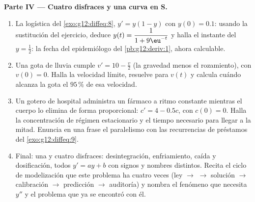 \begin{problem}
\medskip
\noindent\textbf{Parte IV --- Cuatro disfraces y una curva en S.}
\begin{enumerate}[resume]
  \item La  logística del \cref{exo:g12:diffeq:8},
        $y' = y(1 - y)$ con $y(0) = 0.1$: usando la sustitución del
        ejercicio, deduce $y(t) = \dfrac{1}{1 + 9\eu^{-t}}$ y halla el
        instante del  $y = \frac12$: la fecha del
        epidemiólogo del \cref{pb:g12:deriv:1}, ahora calculable.
  \item Una gota de lluvia cumple $v' = 10 - \frac v2$ (la gravedad menos
        el rozamiento), con $v(0) = 0$. Halla la velocidad límite, resuelve
        para $v(t)$ y calcula cuándo alcanza la gota el $95\,\%$ de esa
        velocidad.
  \item Un gotero de hospital administra un fármaco a ritmo constante
        mientras el cuerpo lo elimina de forma proporcional:
        $c' = 4 - 0.5c$, con $c(0) = 0$. Halla la concentración de régimen
        estacionario y el tiempo necesario para llegar a la mitad. Enuncia
        en una frase el paralelismo con las recurrencias de préstamos del
        \cref{exo:g12:diffeq:9}.
  \item Final: una  y cuatro disfraces: desintegración,
        enfriamiento, caída y dosificación, todos $y' = ay + b$ con signos
        y nombres distintos. Recita el ciclo de modelización que este
        problema ha  cuatro veces (ley $\to$  $\to$
        solución $\to$ calibración $\to$ predicción $\to$ auditoría) y
        nombra el fenómeno que necesita $y''$ y el problema que ya se
        encontró con él.
\end{enumerate}
\end{problem}
